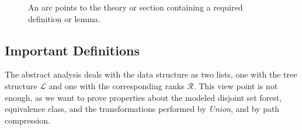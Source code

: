 \documentclass[headsepline,footsepline,footinclude=false,oneside,fontsize=11pt,paper=a4,listof=totoc,bibliography=totoc]{scrbook} %
\begin{document}
\begin{figure}
{
	}
	\caption{Overview of the logical dependencies between the theories presented.} \caption*{An arc points to the theory or section containing a required definition or lemma.}
\end{figure}

\subsection{Important Definitions}
The abstract analysis deals with the data structure as two lists, one with the tree structure $\mathcal{L}$ and one with the corresponding ranks $\mathcal{R}$. This view point is not enough, as we want to prove properties about the modeled disjoint set forest, equivalence class, and the transformations performed by \textit{Union}, and by path compression.
\end{document}
